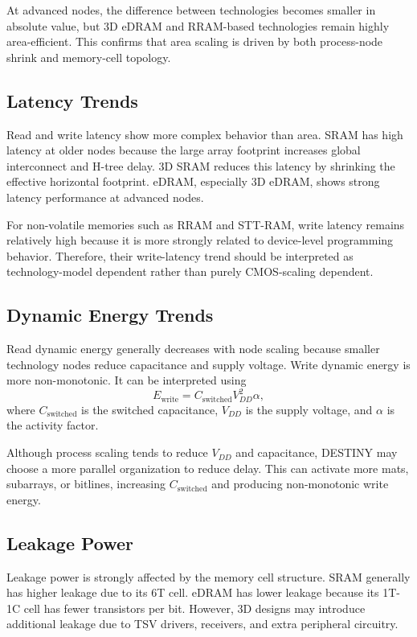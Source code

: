\documentclass[conference]{IEEEtran}
\begin{document}
At advanced nodes, the difference between technologies becomes smaller in absolute value, but 3D eDRAM and RRAM-based technologies remain highly area-efficient. This confirms that area scaling is driven by both process-node shrink and memory-cell topology.

\subsection{Latency Trends}

Read and write latency show more complex behavior than area. SRAM has high latency at older nodes because the large array footprint increases global interconnect and H-tree delay. 3D SRAM reduces this latency by shrinking the effective horizontal footprint. eDRAM, especially 3D eDRAM, shows strong latency performance at advanced nodes.

For non-volatile memories such as RRAM and STT-RAM, write latency remains relatively high because it is more strongly related to device-level programming behavior. Therefore, their write-latency trend should be interpreted as technology-model dependent rather than purely CMOS-scaling dependent.

\subsection{Dynamic Energy Trends}

Read dynamic energy generally decreases with node scaling because smaller technology nodes reduce capacitance and supply voltage. Write dynamic energy is more non-monotonic. It can be interpreted using
\begin{equation}
E_{\mathrm{write}} = C_{\mathrm{switched}} V_{DD}^{2} \alpha ,
\label{eq:energy}
\end{equation}
where $C_{\mathrm{switched}}$ is the switched capacitance, $V_{DD}$ is the supply voltage, and $\alpha$ is the activity factor.

Although process scaling tends to reduce $V_{DD}$ and capacitance, DESTINY may choose a more parallel organization to reduce delay. This can activate more mats, subarrays, or bitlines, increasing $C_{\mathrm{switched}}$ and producing non-monotonic write energy.

\subsection{Leakage Power}

Leakage power is strongly affected by the memory cell structure. SRAM generally has higher leakage due to its 6T cell. eDRAM has lower leakage because its 1T-1C cell has fewer transistors per bit. However, 3D designs may introduce additional leakage due to TSV drivers, receivers, and extra peripheral circuitry.
\end{document}
